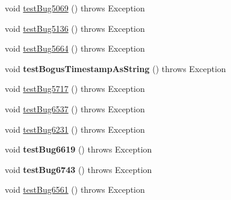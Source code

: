 \begin{DoxyCompactItemize}
\item 
void \mbox{\hyperlink{classtestsuite_1_1regression_1_1_result_set_regression_test_a3fc2285158514cb2ab7dcc1e3880113b}{test\+Bug5069}} ()  throws Exception 
\item 
void \mbox{\hyperlink{classtestsuite_1_1regression_1_1_result_set_regression_test_a9f4b082f0411dbf1f533998671d080cd}{test\+Bug5136}} ()  throws Exception 
\item 
void \mbox{\hyperlink{classtestsuite_1_1regression_1_1_result_set_regression_test_aaf08edff0fccda829794321f5eed7ca3}{test\+Bug5664}} ()  throws Exception 
\item 
\mbox{\label{classtestsuite_1_1regression_1_1_result_set_regression_test_ad40a060d01d13a1c3718497ece0ea53b}} 
void {\bfseries test\+Bogus\+Timestamp\+As\+String} ()  throws Exception 
\item 
void \mbox{\hyperlink{classtestsuite_1_1regression_1_1_result_set_regression_test_a08e8e83e8ac874e16cd5aa89e43f6862}{test\+Bug5717}} ()  throws Exception 
\item 
void \mbox{\hyperlink{classtestsuite_1_1regression_1_1_result_set_regression_test_abe87e577ef06bd6b70aa3f685177c272}{test\+Bug6537}} ()  throws Exception 
\item 
void \mbox{\hyperlink{classtestsuite_1_1regression_1_1_result_set_regression_test_aeb09775b50784baa772c121c33812f23}{test\+Bug6231}} ()  throws Exception 
\item 
\mbox{\label{classtestsuite_1_1regression_1_1_result_set_regression_test_a53c45e064577ff74f71310ab3a226198}} 
void {\bfseries test\+Bug6619} ()  throws Exception 
\item 
\mbox{\label{classtestsuite_1_1regression_1_1_result_set_regression_test_a7554fa92dd3ec004371bce0ace54f245}} 
void {\bfseries test\+Bug6743} ()  throws Exception 
\item 
void \mbox{\hyperlink{classtestsuite_1_1regression_1_1_result_set_regression_test_acd7be9d4220a08025d79f53a76395993}{test\+Bug6561}} ()  throws Exception 
\item 
\mbox{\label{classtestsuite_1_1regression_1_1_result_set_regression_test_ac63ee9e876d4d96c9d1ca956622cd2ec}} 

\end{DoxyCompactItemize}
